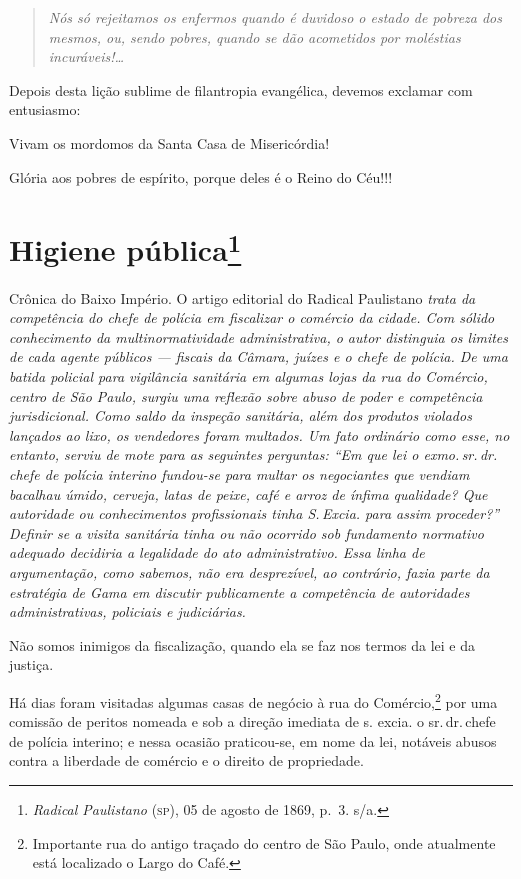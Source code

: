 \begin{quote}
\emph{Nós só rejeitamos os enfermos quando é duvidoso o estado de
pobreza dos mesmos, ou, sendo pobres, quando se dão acometidos por
moléstias incuráveis!\ldots{}}
\end{quote}

Depois desta lição sublime de filantropia evangélica, devemos exclamar
com entusiasmo:

Vivam os mordomos da Santa Casa de Misericórdia!

Glória aos pobres de espírito, porque deles é o Reino do Céu!!!

\chapter{Higiene pública\footnote{\emph{Radical Paulistano} (\textsc{sp}),
  05 de agosto de 1869, p.~3. s/a.}}

\begin{didascalia}
Crônica do Baixo Império. O artigo editorial do Radical Paulistano
\emph{trata da competência do chefe de polícia em fiscalizar o comércio
da cidade. Com sólido conhecimento da multinormatividade administrativa,
o autor distinguia os limites de cada agente públicos --- fiscais da
Câmara, juízes e o chefe de polícia. De uma batida policial para
vigilância sanitária em algumas lojas da rua do Comércio, centro de São
Paulo, surgiu uma reflexão sobre abuso de poder e competência
jurisdicional. Como saldo da inspeção sanitária, além dos produtos
violados lançados ao lixo, os vendedores foram multados. Um fato
ordinário como esse, no entanto, serviu de mote para as seguintes
perguntas: ``Em que lei o exmo.\,sr.\,dr.\,chefe de polícia interino
fundou-se para multar os negociantes que vendiam bacalhau úmido,
cerveja, latas de peixe, café e arroz de ínfima qualidade? Que
autoridade ou conhecimentos profissionais tinha S.\,Excia. para assim
proceder?'' Definir se a visita sanitária tinha ou não ocorrido sob
fundamento normativo adequado decidiria a legalidade do ato
administrativo. Essa linha de argumentação, como sabemos, não era
desprezível, ao contrário, fazia parte da estratégia de Gama em discutir
publicamente a competência de autoridades administrativas, policiais e
judiciárias.}
\end{didascalia}



Não somos inimigos da fiscalização, quando ela se faz nos termos da lei
e da justiça.

Há dias foram visitadas algumas casas de negócio à rua do
Comércio,\footnote{Importante rua do antigo traçado do centro de São
  Paulo, onde atualmente está localizado o Largo do Café.} por uma
comissão de peritos nomeada e sob a direção imediata de s. excia. o sr.\,dr.\,chefe de polícia interino; e nessa ocasião praticou-se, em nome da
lei, notáveis abusos contra a liberdade de comércio e o direito de
propriedade.

